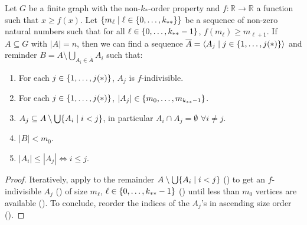         \begin{lemma} \label{lem:existance_of_ordered_f_indivisible_partitions}
            Let $G$ be a finite graph with the non-$k_{*}$-order property and $f: \mathbb{R} \longrightarrow \mathbb{R}$ a function
            such that $x \geq f(x)$.
            Let $\{ m_\ell \mid \ell \in \{ 0, \dots, k_{**} \} \}$ be a sequence of non-zero natural numbers such that
            for all $\ell \in \{ 0, \dots, k_{**}-1 \}$, $f(m_{\ell}) \geq m_{\ell+1}$.
            If $A \subseteq G$ with $|A| = n$, then we can find a sequence $\overline{A} = \left< A_j \mid j \in \{ 1, \dots, j(*) \} \right>$
            and reminder $B = A \setminus \bigcup_{A_i \in \overline{A}} A_i$ such that:
            \begin{enumerate}
                \item \label{itm:existance_of_ordered_f_indivisible_partitions.1} For each $j \in \{ 1, \dots, j(*) \}$, $A_j$ is $f$-indivisible.
                \item \label{itm:existance_of_ordered_f_indivisible_partitions.2} For each $j \in \{ 1, \dots, j(*) \}$, $|A_j| \in \{ m_0, \dots, m_{k_{**}-1} \}$.
                \item \label{itm:existance_of_ordered_f_indivisible_partitions.3} $A_j \subseteq A \setminus \bigcup\{ A_i \mid i < j \}$, in particular $A_i \cap A_j = \emptyset$ $\forall i \neq j$.
                \item \label{itm:existance_of_ordered_f_indivisible_partitions.4} $|B| < m_0$.
                \item \label{itm:existance_of_ordered_f_indivisible_partitions.5} $|A_i| \leq |A_j| \Leftrightarrow i \leq j$.
            \end{enumerate}
            \begin{proof}
                Iteratively, apply  to the remainder $A \setminus \bigcup \{ A_i \mid i < j \}$
                () to get an $f$-indivisible $A_j$ () of size $m_\ell$, $\ell \in \{ 0, \dots, k_{**}-1 \}$
                () until less than $m_0$ vertices are available ().
                To conclude, reorder the indices of the $A_j$'s in ascending size order ().
            \end{proof}
        \end{lemma}

